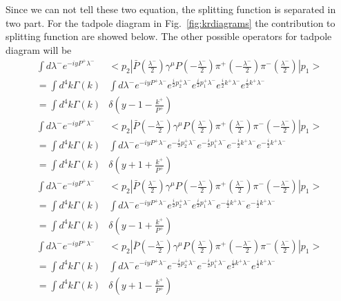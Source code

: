 \documentclass[preprintnumbers,prd,superscriptaddress,preprint]{revtex4-1}
\begin{document}
	Since we can not tell these two equation, the splitting function is separated in two part. For the tadpole diagram in Fig.~\ref{fig:krdiagrams} the contribution to splitting function are showed below.
	The other possible operators for tadpole diagram will be \begin{align*}
		\int d\lambda^{-}e^{-iyP^{+}\lambda^{-}} & <p_{2}|\bar{P}(\frac{\lambda^{-}}{2})\gamma^{\mu}P(-\frac{\lambda^{-}}{2})\pi^{+}(-\frac{\lambda^{-}}{2})\pi^{-}(\frac{\lambda^{-}}{2})|p_{1}>\\
		=\int d^{4}k\Gamma(k) & \int d\lambda^{-}e^{-iyP^{+}\lambda^{-}}e^{\frac{i}{2}p_{2}^{+}\lambda^{-}}e^{\frac{i}{2}p_{1}^{+}\lambda^{-}}e^{\frac{i}{2}k^{+}\lambda^{-}}e^{\frac{i}{2}k^{+}\lambda^{-}}\\
		=\int d^{4}k\Gamma(k) & \delta(y-1-\frac{k^{+}}{P^{+}})\\
		\int d\lambda^{-}e^{-iyP^{+}\lambda^{-}} & <p_{2}|\bar{P}(-\frac{\lambda^{-}}{2})\gamma^{\mu}P(\frac{\lambda^{-}}{2})\pi^{+}(\frac{\lambda^{-}}{2})\pi^{-}(-\frac{\lambda^{-}}{2})|p_{1}>\\
		=\int d^{4}k\Gamma(k) & \int d\lambda^{-}e^{-iyP^{+}\lambda^{-}}e^{-\frac{i}{2}p_{2}^{+}\lambda^{-}}e^{-\frac{i}{2}p_{1}^{+}\lambda^{-}}e^{-\frac{i}{2}k^{+}\lambda^{-}}e^{-\frac{i}{2}k^{+}\lambda^{-}}\\
		=\int d^{4}k\Gamma(k) & \delta(y+1+\frac{k^{+}}{P^{+}})
	\end{align*}
	\begin{align*}
		\int d\lambda^{-}e^{-iyP^{+}\lambda^{-}} & <p_{2}|\bar{P}(\frac{\lambda^{-}}{2})\gamma^{\mu}P(-\frac{\lambda^{-}}{2})\pi^{+}(\frac{\lambda^{-}}{2})\pi^{-}(-\frac{\lambda^{-}}{2})|p_{1}>\\
		=\int d^{4}k\Gamma(k) & \int d\lambda^{-}e^{-iyP^{+}\lambda^{-}}e^{\frac{i}{2}p_{2}^{+}\lambda^{-}}e^{\frac{i}{2}p_{1}^{+}\lambda^{-}}e^{-\frac{i}{2}k^{+}\lambda^{-}}e^{-\frac{i}{2}k^{+}\lambda^{-}}\\
		=\int d^{4}k\Gamma(k) & \delta(y-1+\frac{k^{+}}{P^{+}})\\
		\int d\lambda^{-}e^{-iyP^{+}\lambda^{-}} & <p_{2}|\bar{P}(-\frac{\lambda^{-}}{2})\gamma^{\mu}P(\frac{\lambda^{-}}{2})\pi^{+}(-\frac{\lambda^{-}}{2})\pi^{-}(\frac{\lambda^{-}}{2})|p_{1}>\\
		=\int d^{4}k\Gamma(k) & \int d\lambda^{-}e^{-iyP^{+}\lambda^{-}}e^{-\frac{i}{2}p_{2}^{+}\lambda^{-}}e^{-\frac{i}{2}p_{1}^{+}\lambda^{-}}e^{\frac{i}{2}k^{+}\lambda^{-}}e^{\frac{i}{2}k^{+}\lambda^{-}}\\
		=\int d^{4}k\Gamma(k) & \delta(y+1-\frac{k^{+}}{P^{+}})
	\end{align*}
	
\end{document}
